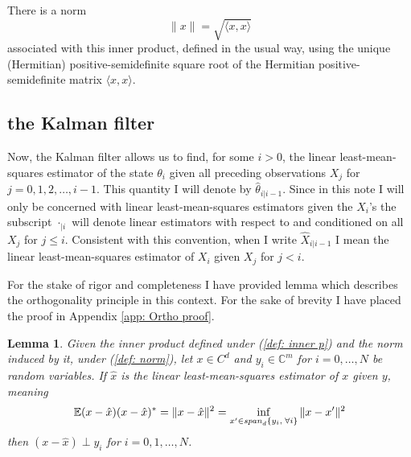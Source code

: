 \documentclass[12pt]{amsart}
\newcommand{\E}{\mathbb{E}}
\newcommand{\C}{\mathbb{C}}
\newtheorem{lemma}{Lemma}
\begin{document}
There is a norm 
\begin{equation}
\|x\|=\sqrt{\langle x,x \rangle}
\label{def: norm}
\end{equation} associated with this inner product, defined in the usual way, using the unique (Hermitian) positive-semidefinite square root of the Hermitian positive-semidefinite matrix $\langle x,x \rangle$.    

\subsection{the Kalman filter}
Now, the Kalman filter allows us to find, for some $i>0$, the linear least-mean-squares estimator of the state $\theta_{i}$ given all preceding observations $X_j$ for $j = 0,1,2,\dots, i-1$. 
This quantity I will denote by $\hat{\theta}_{i|i-1}$. Since in this note I will only be concerned with linear least-mean-squares estimators given the $X_i$'s the subscript $\cdot_{|i}$ will denote linear estimators with respect to and conditioned on all $X_j$ for $j \le i$. 
Consistent with this convention, when I write $\hat{X}_{i|i-1}$ I mean the linear least-mean-squares estimator of $X_i$ given $X_j$ for $j < i$. 

For the stake of rigor and completeness I have provided lemma which describes the orthogonality principle in this context. For the sake of brevity I have placed the proof in Appendix \ref{app: Ortho proof}.

\begin{lemma}
	\label{lem: otho p}
	Given the inner product defined under (\ref{def: inner p}) and the norm induced by it, under (\ref{def: norm}), let $x\in C^d$ and $y_i \in \C^m$ for $i=0,\dots,N$ be random variables. If $\hat x$ is the linear least-mean-squares estimator of $x$ given $y$, meaning 
	$$\E(x-\hat x)(x-\hat x)^* = \|x-\hat x\|^2 = \inf_{x'\in \text{\emph{span}}_d\{y_i,\;\forall i\}} \|x-x'\|^2$$
	then $(x-\hat x) \perp y_i$ for $i=0,1,\dots,N$. 
\end{lemma}
\end{document}
